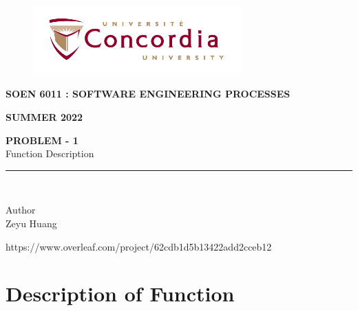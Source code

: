 \documentclass[letterpaper, 11pt]{report}
\begin{document}
\begin{titlepage}
\vspace*{0.7in}
\begin{center}
\begin{figure}[htb]
\begin{center}
\includegraphics[width=8cm]{univ_logo}
\end{center}
\end{figure}
\vspace*{0.3in}
\begin{Large}
\textbf{SOEN 6011 : SOFTWARE ENGINEERING PROCESSES} \\
\end{Large}
\vspace*{0.1in}
\begin{Large}
\textbf{SUMMER 2022} \\
\end{Large}
\vspace*{0.9in}
\begin{Large}
\textbf{PROBLEM - 1} \\
Function Description \\
\end{Large}
\vspace*{0.625in}
\rule{80mm}{0.1mm}\\
\vspace*{0.1in}
\begin{large}
Author \\
\vspace*{0.1in}
Zeyu Huang\\

\vspace*{0.3in}
\date{\normalsize\today} 
\end{large}
\end{center}
\begin{center}
https://www.overleaf.com/project/62cdb1d5b13422add2cceb12\end{center}
\end{titlepage}
\tableofcontents
\newpage
{}
\section*{Description of Function}
\end{document}
